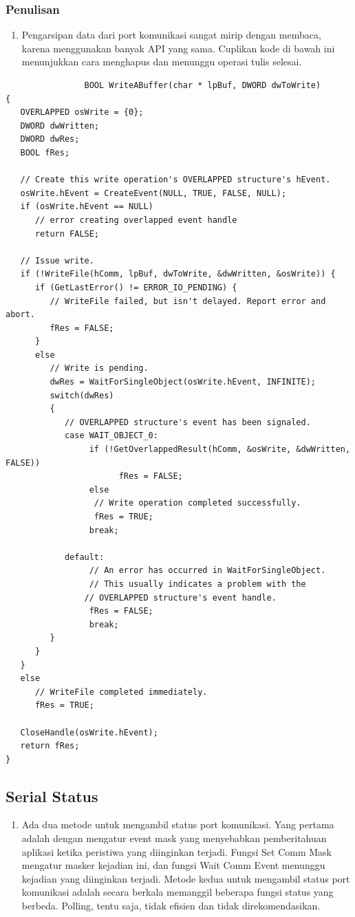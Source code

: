 			\subsubsection{Penulisan}
				\begin{enumerate}
					\item Pengarsipan data dari port komunikasi sangat mirip dengan membaca, karena menggunakan banyak API yang sama. Cuplikan kode di bawah ini menunjukkan cara menghapus dan menunggu operasi tulis selesai.
				\end{enumerate}
				\begin{verbatim}
				BOOL WriteABuffer(char * lpBuf, DWORD dwToWrite)
{
   OVERLAPPED osWrite = {0};
   DWORD dwWritten;
   DWORD dwRes;
   BOOL fRes;

   // Create this write operation's OVERLAPPED structure's hEvent.
   osWrite.hEvent = CreateEvent(NULL, TRUE, FALSE, NULL);
   if (osWrite.hEvent == NULL)
      // error creating overlapped event handle
      return FALSE;

   // Issue write.
   if (!WriteFile(hComm, lpBuf, dwToWrite, &dwWritten, &osWrite)) {
      if (GetLastError() != ERROR_IO_PENDING) { 
         // WriteFile failed, but isn't delayed. Report error and abort.
         fRes = FALSE;
      }
      else
         // Write is pending.
         dwRes = WaitForSingleObject(osWrite.hEvent, INFINITE);
         switch(dwRes)
         {
            // OVERLAPPED structure's event has been signaled. 
            case WAIT_OBJECT_0:
                 if (!GetOverlappedResult(hComm, &osWrite, &dwWritten, FALSE))
                       fRes = FALSE;
                 else
                  // Write operation completed successfully.
                  fRes = TRUE;
                 break;
            
            default:
                 // An error has occurred in WaitForSingleObject.
                 // This usually indicates a problem with the
                // OVERLAPPED structure's event handle.
                 fRes = FALSE;
                 break;
         }
      }
   }
   else
      // WriteFile completed immediately.
      fRes = TRUE;

   CloseHandle(osWrite.hEvent);
   return fRes;
}
\end{verbatim}	

	\subsection{Serial Status}
		\begin{enumerate}
			\item Ada dua metode untuk mengambil status port komunikasi. Yang pertama adalah dengan mengatur event mask yang menyebabkan pemberitahuan aplikasi ketika peristiwa yang diinginkan terjadi. Fungsi Set Comm Mask mengatur masker kejadian ini, dan fungsi Wait Comm Event menunggu kejadian yang diinginkan terjadi. Metode kedua untuk mengambil status port komunikasi adalah secara berkala memanggil beberapa fungsi status yang berbeda. Polling, tentu saja, tidak efisien dan tidak direkomendasikan.
		\end{enumerate}
